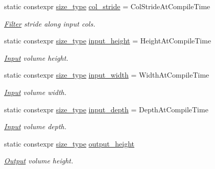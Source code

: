 \begin{DoxyCompactItemize}
static constexpr \hyperlink{namespaceffnn_a63b90a2fd70eb76684eac482a51633e5}{size\-\_\-type} \hyperlink{structffnn_1_1layer_1_1convolution_1_1options_a9f5dc60cb9493d65119fa087c63c0c93}{col\-\_\-stride} = Col\-Stride\-At\-Compile\-Time
\begin{DoxyCompactList}\small\item\em \hyperlink{structffnn_1_1layer_1_1convolution_1_1_filter}{Filter} stride along input cols. \end{DoxyCompactList}\item 
static constexpr \hyperlink{namespaceffnn_a63b90a2fd70eb76684eac482a51633e5}{size\-\_\-type} \hyperlink{structffnn_1_1layer_1_1convolution_1_1options_aabb3c99df1150983902ebf9741a22a1a}{input\-\_\-height} = Height\-At\-Compile\-Time
\begin{DoxyCompactList}\small\item\em \hyperlink{classffnn_1_1layer_1_1_input}{Input} volume height. \end{DoxyCompactList}\item 
static constexpr \hyperlink{namespaceffnn_a63b90a2fd70eb76684eac482a51633e5}{size\-\_\-type} \hyperlink{structffnn_1_1layer_1_1convolution_1_1options_a17abc9ea9d41cf399fbeae5e3f7580f4}{input\-\_\-width} = Width\-At\-Compile\-Time
\begin{DoxyCompactList}\small\item\em \hyperlink{classffnn_1_1layer_1_1_input}{Input} volume width. \end{DoxyCompactList}\item 
static constexpr \hyperlink{namespaceffnn_a63b90a2fd70eb76684eac482a51633e5}{size\-\_\-type} \hyperlink{structffnn_1_1layer_1_1convolution_1_1options_a5c928d8733be98927ccd22d009739deb}{input\-\_\-depth} = Depth\-At\-Compile\-Time
\begin{DoxyCompactList}\small\item\em \hyperlink{classffnn_1_1layer_1_1_input}{Input} volume depth. \end{DoxyCompactList}\item 
static constexpr \hyperlink{namespaceffnn_a63b90a2fd70eb76684eac482a51633e5}{size\-\_\-type} \hyperlink{structffnn_1_1layer_1_1convolution_1_1options_a87fc0d1d3147a21912001842783a0d54}{output\-\_\-height}
\begin{DoxyCompactList}\small\item\em \hyperlink{classffnn_1_1layer_1_1_output}{Output} volume height. \end{DoxyCompactList}\item 

\end{DoxyCompactItemize}
